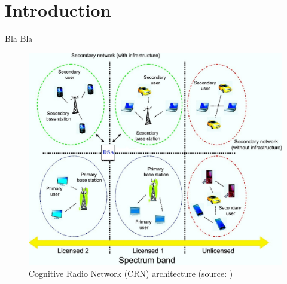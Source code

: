 \chapter{Introduction}\label{introduction}
Bla Bla

\begin{figure}[!htb]
\begin{center}
	\includegraphics[scale=0.5]{figures/crn.jpg}
	\caption{Cognitive Radio Network (CRN) architecture (source: \cite{r17})}
	\label{fig:crn}
\end{center}
\end{figure}



